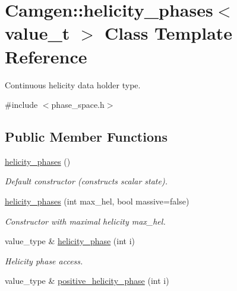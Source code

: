 \hypertarget{a00275}{}\section{Camgen\+:\+:helicity\+\_\+phases$<$ value\+\_\+t $>$ Class Template Reference}
\label{a00275}


Continuous helicity data holder type.  




{\ttfamily \#include $<$phase\+\_\+space.\+h$>$}

\subsection*{Public Member Functions}
\begin{DoxyCompactItemize}
\item 
\hypertarget{a00275_a5f5f9351481028c0a7062da4e1319234}{}\hyperlink{a00275_a5f5f9351481028c0a7062da4e1319234}{helicity\+\_\+phases} ()\label{a00275_a5f5f9351481028c0a7062da4e1319234}

\begin{DoxyCompactList}\small\item\em Default constructor (constructs scalar state). \end{DoxyCompactList}\item 
\hypertarget{a00275_a9b2e699f79b1e741958ff2a439017c13}{}\hyperlink{a00275_a9b2e699f79b1e741958ff2a439017c13}{helicity\+\_\+phases} (int max\+\_\+hel, bool massive=false)\label{a00275_a9b2e699f79b1e741958ff2a439017c13}

\begin{DoxyCompactList}\small\item\em Constructor with maximal helicity max\+\_\+hel. \end{DoxyCompactList}\item 
\hypertarget{a00275_a06604417c978a0035de8e49af206396e}{}value\+\_\+type \& \hyperlink{a00275_a06604417c978a0035de8e49af206396e}{helicity\+\_\+phase} (int i)\label{a00275_a06604417c978a0035de8e49af206396e}

\begin{DoxyCompactList}\small\item\em Helicity phase access. \end{DoxyCompactList}\item 
\hypertarget{a00275_a45714de482d1835e558d9b66b5edba61}{}value\+\_\+type \& \hyperlink{a00275_a45714de482d1835e558d9b66b5edba61}{positive\+\_\+helicity\+\_\+phase} (int i)\label{a00275_a45714de482d1835e558d9b66b5edba61}


\end{DoxyCompactItemize}
